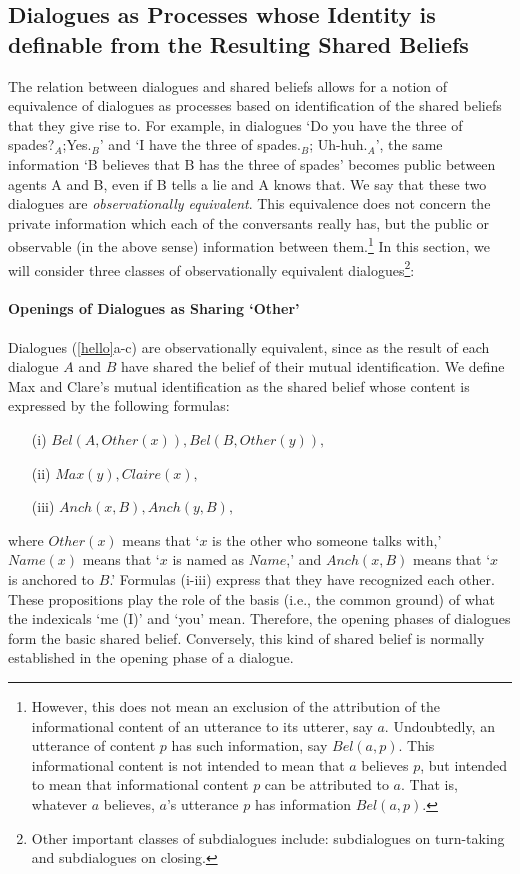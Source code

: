 \subsection{Dialogues as Processes whose Identity is definable from the Resulting Shared Beliefs}
The relation between dialogues and shared beliefs allows for a notion of equivalence of dialogues as processes based on identification of the shared beliefs that they give rise to.
For example, in dialogues
 `Do you have the three of spades?$_A$;Yes.$_B$' and `I have the three of spades.$_B$; Uh-huh.$_A$', the same information `B believes that B has the three of spades' becomes public between agents A and B, even if B tells a lie and A knows that.
We say that these two dialogues are {\it observationally equivalent}.
This equivalence does not concern the private information which each of the conversants really has, but the public or observable (in the above sense) information between them.\<\footnote{
However, this does not mean an exclusion of the attribution of the informational content of an utterance to its utterer, say $a$.
Undoubtedly, an utterance of content $p$ has such information, say $Bel(a,p)$.
This informational content is not intended to mean that $a$ believes $p$,
but intended to mean that informational content $p$ can be attributed to $a$.
That is, whatever $a$ believes, $a$'s utterance $p$ has information $Bel(a,p)$.}
In this section, we will consider three classes of observationally equivalent dialogues\<\footnote{
Other important classes of subdialogues include: subdialogues on turn-taking and subdialogues on closing.
}: 
\paragraph{Openings of Dialogues as Sharing `Other'} 
Dialogues (\ref{hello}a-c) are observationally equivalent, since as the result of each dialogue $A$ and $B$ have shared the belief of their mutual identification.
We define Max and Clare's mutual identification as the shared belief whose content is expressed by the following formulas:
\begin{itemize}
\item[(i)] $Bel(A,Other(x)),Bel(B,Other(y)),$
\item[(ii)] $Max(y),Claire(x),$
\item[(iii)] $Anch(x,B),Anch(y,B),$
\end{itemize}
where $Other(x)$ means that `$x$ is the other who someone talks with,'
$Name(x)$ means that `$x$ is named as $Name$,'
and $Anch(x,B)$ means that `$x$ is anchored to $B$.'
Formulas (i-iii) express that they have recognized each other.
These propositions play the role of the basis (i.e., the common ground) of what the indexicals `me (I)' and `you' mean.
Therefore, the opening phases of dialogues form the basic shared belief.
Conversely, this kind of shared belief is normally established in the opening phase of a dialogue.
